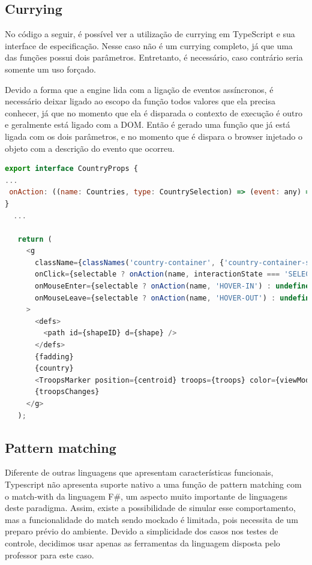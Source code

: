 \documentclass[rel_mlp]{iiufrgs}
\begin{document}
\subsection{Currying}
No código a seguir, é possível ver a utilização de currying em TypeScript e sua interface de especificação. Nesse caso não é um currying completo, já que uma das funções possui dois parâmetros. Entretanto, é necessário, caso contrário seria somente um uso forçado. \par
Devido a forma que a engine lida com a ligação de eventos assíncronos, é necessário deixar ligado ao escopo da função todos valores que ela precisa conhecer, já que no momento que ela é disparada o contexto de execução é outro e geralmente está ligado com a DOM. Então é gerado uma função que já está ligada com os dois parâmetros, e no momento que é dispara o browser injetado o objeto com a descrição do evento que ocorreu.
\begin{lstlisting}[language = JavaScript]
export interface CountryProps {
...
 onAction: ((name: Countries, type: CountrySelection) => (event: any) => void);
}
  ...

   return (
     <g
       className={classNames('country-container', {'country-container-selectable': selectable})}
       onClick={selectable ? onAction(name, interactionState === 'SELECT' ? 'SELECTION-OUT' : 'SELECTION-IN') : undefined}
       onMouseEnter={selectable ? onAction(name, 'HOVER-IN') : undefined}
       onMouseLeave={selectable ? onAction(name, 'HOVER-OUT') : undefined}
     >
       <defs>
         <path id={shapeID} d={shape} />
       </defs>
       {fadding}
       {country}
       <TroopsMarker position={centroid} troops={troops} color={viewMode === 'CONTINENT' ? playerColor.normal : '#000000'} />
       {troopsChanges}
     </g>
   );

\end{lstlisting}

\subsection{Pattern matching}
Diferente de outras linguagens que apresentam características funcionais, Typescript não apresenta suporte nativo a uma função de pattern matching com o match-with da linguagem F\#, um aspecto muito importante de linguagens deste paradigma. Assim, existe a possibilidade de simular esse comportamento, mas a funcionalidade do match sendo mockado é limitada, pois necessita de um preparo prévio do ambiente. Devido a simplicidade dos casos nos testes de controle, decidimos usar apenas as ferramentas da linguagem disposta pelo professor para este caso.
\end{document}
